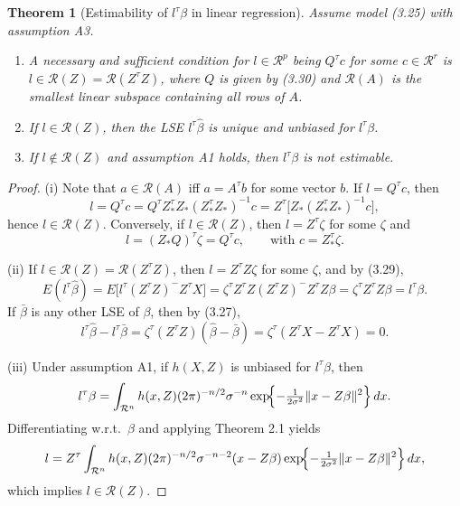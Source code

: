 \documentclass{article}
\newtheorem{theorem}{Theorem}
\begin{document}
%
%

\begin{theorem}[Estimability of $l^\tau \beta$ in linear regression]
\label{thm:3.6}
Assume model (3.25) with assumption A3.
\begin{enumerate}
\item[(i)] A necessary and sufficient condition for $l \in \mathcal{R}^p$ being
  $Q^\tau c$ for some $c \in \mathcal{R}^r$ is
  $l \in \mathcal{R}(Z) = \mathcal{R}(Z^\tau Z)$,
  where $Q$ is given by (3.30) and $\mathcal{R}(A)$ is the smallest linear
  subspace containing all rows of $A$.
\item[(ii)] If $l \in \mathcal{R}(Z)$, then the LSE $l^\tau \hat{\beta}$ is
  unique and unbiased for $l^\tau \beta$.
\item[(iii)] If $l \notin \mathcal{R}(Z)$ and assumption A1 holds, then
  $l^\tau \beta$ is not estimable.
\end{enumerate}
\end{theorem}

\begin{proof}
(i) Note that $a \in \mathcal{R}(A)$ iff $a = A^\tau b$ for some vector $b$.
If $l = Q^\tau c$, then
\[
  l = Q^\tau c
    = Q^\tau Z_*^\tau Z_* (Z_*^\tau Z_*)^{-1} c
    = Z^\tau \bigl[ Z_* (Z_*^\tau Z_*)^{-1} c \bigr],
\]
hence $l \in \mathcal{R}(Z)$. Conversely, if $l \in \mathcal{R}(Z)$, then
$l = Z^\tau \zeta$ for some $\zeta$ and
\[
  l = (Z_* Q)^\tau \zeta = Q^\tau c, \qquad \text{with } c = Z_*^\tau \zeta.
\]

(ii) If $l \in \mathcal{R}(Z) = \mathcal{R}(Z^\tau Z)$, then $l = Z^\tau Z \zeta$
for some $\zeta$, and by (3.29),
\[
  E(l^\tau \hat{\beta})
    = E\bigl[ l^\tau (Z^\tau Z)^{-} Z^\tau X \bigr]
    = \zeta^\tau Z^\tau Z (Z^\tau Z)^{-} Z^\tau Z \beta
    = \zeta^\tau Z^\tau Z \beta
    = l^\tau \beta.
\]
If $\bar{\beta}$ is any other LSE of $\beta$, then by (3.27),
\[
  l^\tau \hat{\beta} - l^\tau \bar{\beta}
    = \zeta^\tau (Z^\tau Z)(\hat{\beta} - \bar{\beta})
    = \zeta^\tau (Z^\tau X - Z^\tau X) = 0.
\]

(iii) Under assumption A1, if $h(X,Z)$ is unbiased for $l^\tau \beta$, then
\[
  l^\tau \beta = \int_{\mathcal{R}^n} h(x,Z) (2\pi)^{-n/2} \sigma^{-n}
    \exp\!\Bigl\{ -\tfrac{1}{2\sigma^2} \| x - Z\beta \|^2 \Bigr\} \, dx.
\]
Differentiating w.r.t.\ $\beta$ and applying Theorem 2.1 yields
\[
  l = Z^\tau \int_{\mathcal{R}^n} h(x,Z) (2\pi)^{-n/2} \sigma^{-n-2}
    (x - Z\beta) \exp\!\Bigl\{ -\tfrac{1}{2\sigma^2} \| x - Z\beta \|^2 \Bigr\} \, dx,
\]
which implies $l \in \mathcal{R}(Z)$.
\end{proof}
\end{document}

